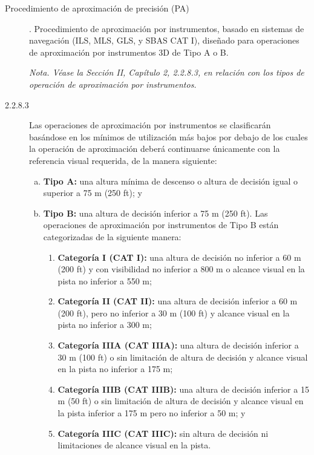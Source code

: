 \begin{tcolorbox}[title={Procedimiento de aproximación por instrumentos (IAP). OACI Anexo 6. Edición 2018}]
{\begin{description}
\item[ Procedimiento de aproximación de precisión (PA)]. Procedimiento de aproximación por instrumentos, basado en sistemas
de navegación (ILS, MLS, GLS, y SBAS CAT I), diseñado para operaciones de aproximación por instrumentos 3D de
Tipo A o B.

\emph{Nota. Véase la Sección II, Capítulo 2, 2.2.8.3, en relación con los tipos de operación de aproximación por instrumentos.}

\end{description}
  }
\end{tcolorbox}

\begin{tcolorbox}
  {\footnotesize

    \begin{description}
      
\item[2.2.8.3] Las operaciones de aproximación por instrumentos se clasificarán basándose en los mínimos de utilización más
bajos por debajo de los cuales la operación de aproximación deberá continuarse únicamente con la referencia visual requerida,
de la manera siguiente:

\begin{enumerate}[a)]
\item \textbf{Tipo A:} una altura mínima de descenso o altura de decisión igual o superior a 75 m (250 ft); y
\item \textbf{Tipo B:} una altura de decisión inferior a 75 m (250 ft). Las operaciones de aproximación por instrumentos de Tipo B están categorizadas de la siguiente manera:
  \begin{enumerate}[1)]
  \item  \textbf{Categoría I (CAT I):} una altura de decisión no inferior a
    60 m (200 ft) y con visibilidad no inferior a 800 m o alcance
    visual en la pista no inferior a 550 m; 
  \item \textbf{Categoría II (CAT II):}
    una altura de decisión inferior a 60 m (200 ft), pero no inferior
    a 30 m (100 ft) y alcance visual en la pista no inferior a 300 m;
    
  \item \textbf{Categoría IIIA (CAT IIIA):} una altura de decisión inferior a 30
    m (100 ft) o sin limitación de altura de decisión y alcance visual
    en la pista no inferior a 175 m; 
  \item \textbf{Categoría IIIB (CAT IIIB):} una
    altura de decisión inferior a 15 m (50 ft) o sin limitación de
    altura de decisión y alcance visual en la pista inferior a 175 m
    pero no inferior a 50 m; y 
  \item \textbf{Categoría IIIC (CAT IIIC):} sin
    altura de decisión ni limitaciones de alcance visual en la pista.
\end{enumerate}


\end{enumerate}
\end{description}}
\end{tcolorbox}
